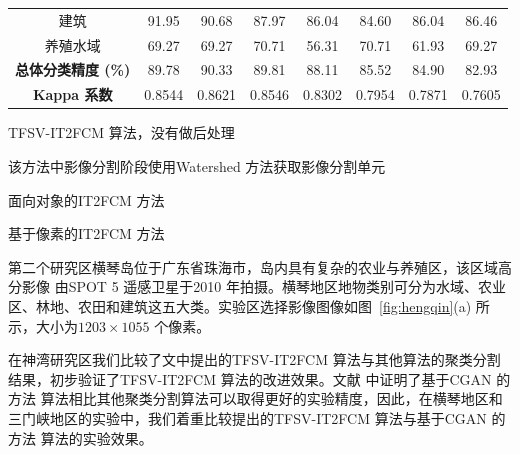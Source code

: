 \begin{table}[htbp]
{\begin{threeparttable}[b]
\begin{tabular}{cccccccc}
                建筑                       & 91.95                & 90.68             & 87.97                & 86.04  & 84.60           & 86.04           & 86.46  \\
                养殖水域                   & 69.27                & 69.27             & 70.71                & 56.31  & 70.71           & 61.93           & 69.27  \\
                \cline{1-8}
                \textbf{总体分类精度 (\%)} & 89.78                & 90.33             & 89.81                & 88.11  & 85.52           & 84.90           & 82.93  \\
                \textbf{Kappa 系数}        & 0.8544               & 0.8621            & 0.8546               & 0.8302 & 0.7954          & 0.7871          & 0.7605 \\
                \bottomrule
            \end{tabular}
            \begin{tablenotes}
                \item[1] {TFSV-IT2FCM 算法，没有做后处理}
                \item[2]{该方法中影像分割阶段使用Watershed 方法获取影像分割单元}
                \item[3]{面向对象的IT2FCM 方法}
                \item[4]{基于像素的IT2FCM 方法}
            \end{tablenotes}

        \end{threeparttable}
    }
\end{table}

第二个研究区横琴岛位于广东省珠海市，岛内具有复杂的农业与养殖区，该区域高分影像
由SPOT 5 遥感卫星于2010 年拍摄。横琴地区地物类别可分为水域、农业区、林地、农田和建筑这五大类。实验区选择影像图像如图~\ref{fig:hengqin}(a) 所示，大小为$1203 \times 1055$ 个像素。

在神湾研究区我们比较了文中提出的TFSV-IT2FCM 算法与其他算法的聚类分割结果，初步验证了TFSV-IT2FCM 算法的改进效果。文献\cite{he2016remote} 中证明了基于CGAN 的方法 算法相比其他聚类分割算法可以取得更好的实验精度，因此，在横琴地区和三门峡地区的实验中，我们着重比较提出的TFSV-IT2FCM 算法与基于CGAN 的方法 算法的实验效果。

